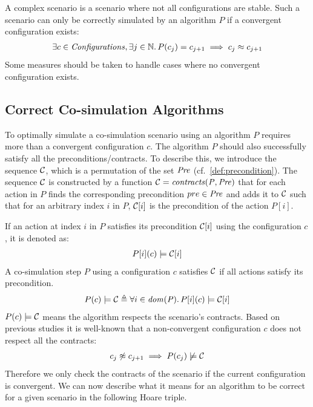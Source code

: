 A complex scenario is a scenario where not all configurations are stable. Such a scenario can only be correctly simulated by an algorithm $P$ if a convergent configuration exists:
\vspace{-1em}
\begin{align}
  \exists c \in \mathit{Configurations}, \exists j \in \mathbb{N} \ldotp P(c_{j}) = c_{j+1} \implies c_{j} \approx c_{j+1}
\end{align}
Some measures should be taken to handle cases where no convergent configuration exists.

\subsection{Correct Co-simulation Algorithms}\label{sec:correctcosim}
To optimally simulate a co-simulation scenario using an algorithm $P$ requires more than a convergent configuration $c$. The algorithm $P$ should also successfully satisfy all the preconditions/contracts. To describe this, we introduce the sequence $\mathcal{C}$, which is a permutation of the set $\mathit{Pre}$ (cf.\ \cref{def:precondition}).
The sequence $\mathcal{C}$ is constructed by a function $\mathcal{C} = \mathit{contracts(P, \mathit{Pre})}$ that for each action in $P$ finds the corresponding precondition $pre \in \mathit{Pre}$ and adds it to $\mathcal{C}$ such that for an arbitrary index $i$ in $P$, $\mathcal{C}[i]$ is the precondition of the action $P[i]$.

If an action at index $i$ in $P$ satisfies its precondition $\mathcal{C}[i]$ using the configuration $c$, it is denoted as:
\vspace{-1em}
\begin{align}
  P[i](c) \models \mathcal{C}[i]
\end{align}
A co-simulation step $P$ using a configuration $c$ satisfies $\mathcal{C}$ if all actions satisfy its precondition. 
\vspace{-1em}
\begin{align}
  P(c) \models \mathcal{C} \triangleq \forall i \in \mathit{dom(P)} \ldotp P[i](c) \models \mathcal{C}[i]
\end{align}
$P(c) \models \mathcal{C}$ means the algorithm respects the scenario's contracts.
Based on previous studies it is well-known that a non-convergent configuration $c$ does not respect all the contracts:
\vspace{-1em}
\begin{align}\label{eq:incorrectConf}
  c_j \not\approx c_{j+1} \implies P(c_j) \not\models \mathcal{C}
\end{align}
Therefore we only check the contracts of the scenario if the current configuration is convergent.
We can now describe what it means for an algorithm to be correct for a given scenario in the following Hoare triple.

